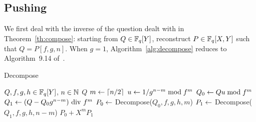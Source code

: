 \documentclass{sig-alternate}
\begin{document}

\subsection{Pushing}

We first deal with the inverse of the question dealt with in
Theorem~\ref{th:compose}: starting from $Q \in \mathbb{F}_q[Y]$, reconstruct
$P \in \mathbb{F}_q[X,Y]$ such that $Q=P[f,g,n]$. When $g=1$,
Algorithm~\ref{alg:decompose} reduces to Algorithm~9.14
of~\cite{vzGG}.

\begin{algorithm}[t]
  \caption{Decompose}
  \label{alg:decompose}
  \begin{algorithmic}[1]
    \REQUIRE $Q,f,g,h\in \mathbb{F}_q[Y]$, $n \in \mathbb{N}$ 
    \RETURN $Q$
    \ELSE 
    \STATE $m \leftarrow \lceil n/2 \rceil$ 
    \STATE $u \leftarrow 1/ g^{n-m}\bmod f^m$ \label{alg:decompose:xgcd} 
    \STATE $Q_0 \leftarrow Q u \bmod f^m$ 
    \STATE $Q_1 \leftarrow (Q-Q_0 g^{n-m}) {\rm~div~} f^m$ 
    \STATE $P_0 \leftarrow$ Decompose($Q_0, f, g, h, m$) 
    \STATE $P_1 \leftarrow$ Decompose($Q_1, f, g, h, n-m$) 
    \RETURN $P_0 + X^m P_1$ 
    \ENDIF
  \end{algorithmic}
\end{algorithm}
\end{document}
